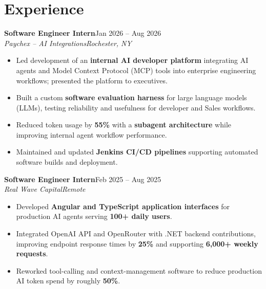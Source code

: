 \documentclass[10pt,letterpaper]{article}
\newif\ifresumeFirstRole
\newcommand{\resumeRole}[4]{\ifresumeFirstRole\global\resumeFirstRolefalse\else\vspace{0pt plus 1fill}\fi\textbf{#1}\hfill #2\\\textit{#3}\hfill\textit{#4}}
\begin{document}
\section*{Experience}
\resumeRole{Software Engineer Intern}{Jan 2026 -- Aug 2026}{Paychex -- AI Integrations}{Rochester, NY}
\begin{itemize}
\item Led development of an \textbf{internal AI developer platform} integrating AI agents and Model Context Protocol (MCP) tools into enterprise engineering workflows; presented the platform to executives.
\item Built a custom \textbf{software evaluation harness} for large language models (LLMs), testing reliability and usefulness for developer and Sales workflows.
\item Reduced token usage by \textbf{55\%} with a \textbf{subagent architecture} while improving internal agent workflow performance.
\item Maintained and updated \textbf{Jenkins CI/CD pipelines} supporting automated software builds and deployment.
\end{itemize}
\resumeRole{Software Engineer Intern}{Feb 2025 -- Aug 2025}{Real Wave Capital}{Remote}
\begin{itemize}
\item Developed \textbf{Angular and TypeScript application interfaces} for production AI agents serving \textbf{100+ daily users}.
\item Integrated OpenAI API and OpenRouter with .NET backend contributions, improving endpoint response times by \textbf{25\%} and supporting \textbf{6,000+ weekly requests}.
\item Reworked tool-calling and context-management software to reduce production AI token spend by roughly \textbf{50\%}.
\end{itemize}
\end{document}
